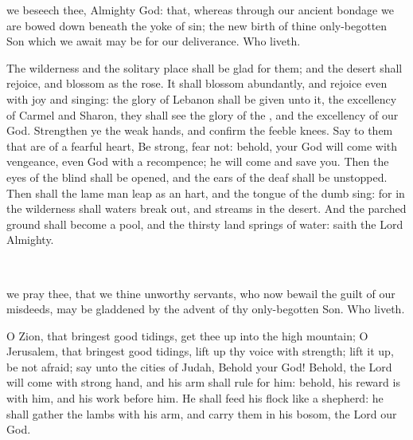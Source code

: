 
\collect
{} we beseech thee, Almighty God: that, whereas through our ancient bondage we are bowed down beneath the yoke of sin; the new birth of thine only-begotten Son which we await may be for our deliverance. Who liveth.

 The wilderness and the solitary place shall be glad for them; and the desert shall rejoice, and blossom as the rose. It shall blossom abundantly, and rejoice even with joy and singing: the glory of Lebanon shall be given unto it, the excellency of Carmel and Sharon, they shall see the glory of the , and the excellency of our God. Strengthen ye the weak hands, and confirm the feeble knees. Say to them that are of a fearful heart, Be strong, fear not: behold, your God will come with vengeance, even God with a recompence; he will come and save you. Then the eyes of the blind shall be opened, and the ears of the deaf shall be unstopped. Then shall the lame man leap as an hart, and the tongue of the dumb sing: for in the wilderness shall waters break out, and streams in the desert. And the parched ground shall become a pool, and the thirsty land springs of water: saith the Lord Almighty.

\\


\collect
{} we pray thee, that we thine unworthy servants, who now bewail the guilt of our misdeeds, may be gladdened by the advent of thy only-begotten Son. Who liveth.

 O Zion, that bringest good tidings, get thee up into the high mountain; O Jerusalem, that bringest good tidings, lift up thy voice with strength; lift it up, be not afraid; say unto the cities of Judah, Behold your God! Behold, the Lord  will come with strong hand, and his arm shall rule for him: behold, his reward is with him, and his work before him. He shall feed his flock like a shepherd: he shall gather the lambs with his arm, and carry them in his bosom, the Lord our God.

